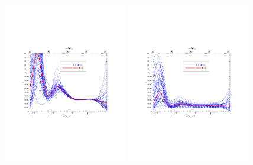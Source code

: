 \documentclass[11pt]{article}
\def \halffigwidth{0.48\textwidth}
\begin{document}
\begin{figure}
  \includegraphics[width=\halffigwidth,  trim = 1in 2.9in 1in 2.9in]{nobicep_spline0_p11_r0d5_eps_traj.pdf}%
  \includegraphics[width=\halffigwidth,  trim = 1in 2.9in 1in 2.9in]{spline0_p11_epsilon_traj.pdf}

\end{figure}
\end{document}
